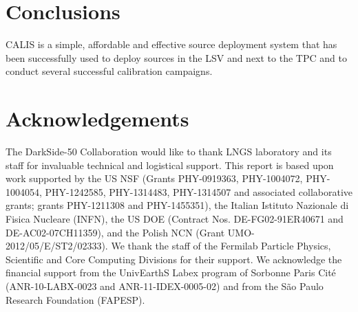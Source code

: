 \section{Conclusions}\label{sec:Conclusions}\label{sec:Conclusion}
CALIS is a simple, affordable and effective source deployment system that has been successfully used to deploy sources in the LSV and next to the TPC and to conduct several successful calibration campaigns.%



\section{Acknowledgements}\label{sec:Acknowledgements}
The DarkSide-50 Collaboration would like to thank LNGS laboratory and its staff for invaluable technical and logistical support. This report is based upon work supported by the US NSF (Grants PHY-0919363, PHY-1004072, PHY-1004054, PHY-1242585, PHY-1314483, PHY-1314507 and associated collaborative grants; grants PHY-1211308 and PHY-1455351), the Italian Istituto Nazionale di Fisica Nucleare (INFN), the US DOE (Contract Nos. DE-FG02-91ER40671 and DE-AC02-07CH11359), and the Polish NCN (Grant UMO-2012/05/E/ST2/02333). We thank the staff of the Fermilab Particle Physics, Scientific and Core Computing Divisions for their support. We acknowledge the financial support from the UnivEarthS Labex program of Sorbonne Paris Cit\'{e} (ANR-10-LABX-0023 and ANR-11-IDEX-0005-02) and from the S\~{a}o Paulo Research Foundation (FAPESP).